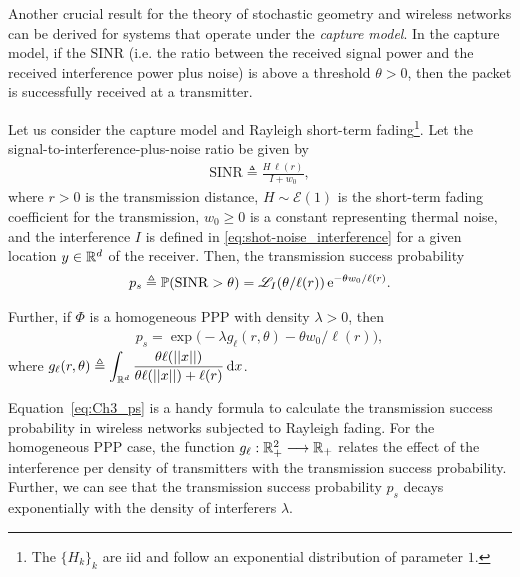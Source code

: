 Another crucial result for the theory of stochastic geometry and wireless networks can be derived for systems that operate under the \textit{capture model}.
%
In the capture model, if the $\mathrm{SINR}$ (i.e. the ratio between the received signal power and the received interference power plus noise) is above a threshold $\theta > 0$, then the packet is successfully received at a transmitter.
%
\begin{proposition} \label{prop:PPP_ps}
    Let us consider the capture model and Rayleigh short-term fading\footnote{The $\{H_k\}_k$ are iid and follow an exponential distribution of parameter $1$.}. Let the signal-to-interference-plus-noise ratio be given by
    \begin{align*}
        \mathrm{SINR} \triangleq \frac{H\,\ell(r)}{I + w_0},
    \end{align*}
    where $r>0$ is the transmission distance, $H\sim\mathscr{E}(1)$ is the short-term fading coefficient for the transmission, $w_0 \ge 0$ is a constant representing thermal noise, and the interference $I$ is defined in \eqref{eq:shot-noise_interference} for a given location $y\in{\mathbb R}^d$ of the receiver.
    Then, the transmission success probability
    \begin{align} \label{eq:Ch3_ps}
        p_s \triangleq {\mathbb P}(\mathrm{SINR} > \theta) = \mathscr{L}_I\!\left( \theta/\ell(r) \right) \mathrm{e}^{-\theta w_0/\ell(r)}.
    \end{align}
    
    Further, if $\Phi$ is a homogeneous PPP with density $\lambda>0$, then
    \begin{align}
        p_s = \exp\!\big( -\lambda g_\ell(r,\theta) - \theta w_0/\ell(r) \big),
    \end{align}
    where $g_\ell(r,\theta) \triangleq \displaystyle\int_{{\mathbb R}^d} \frac{\theta \ell(||x||)}{\theta \ell(||x||)+\ell(r)} \,\mathrm{d} x$.
\end{proposition}
%
Equation~\eqref{eq:Ch3_ps} is a handy formula to calculate the transmission success probability in wireless networks subjected to Rayleigh fading.
%
For the homogeneous PPP case, the function $g_\ell:{\mathbb R}^2_+\longrightarrow{\mathbb R}_+$ relates the effect of the interference per density of transmitters with the transmission success probability.
%
Further, we can see that the transmission success probability $p_s$ decays exponentially with the density of interferers $\lambda$.

